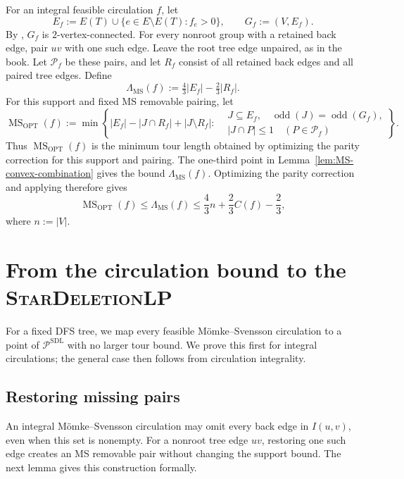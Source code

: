 \documentclass[11pt]{amsart}
\DeclareMathOperator{\odd}{odd}
\newcommand{\1}{\mathbbm{1}}
\newcommand{\MSopt}{\operatorname{MS}_{\mathrm{OPT}}}
\newcommand{\LPone}{\textsc{StarDeletionLP}}
\newcommand{\Pone}{\mathcal P^{\mathrm{SDL}}}
\begin{document}
For an integral feasible circulation $f$, let
\[
 E_f:=E(T)\cup
       \{e\in E\setminus E(T):f_e>0\},
 \qquad G_f:=(V,E_f).
\]
By \cite[Lemma~12.8]{TraubVygen}, $G_f$ is $2$-vertex-connected.
For every nonroot group with a retained back edge, pair $uv$ with
one such edge. Leave the root tree edge unpaired, as in the book.
Let $\mathcal P_f$ be these pairs, and let $R_f$ consist of all
retained back edges and all paired tree edges. Define
\begin{equation}
\label{eq:MS-support-bound}
 \Lambda_{\mathrm{MS}}(f):=\tfrac43|E_f|-\tfrac23|R_f|.
\end{equation}
For this support and fixed \textsc{MS} removable pairing, let
\begin{equation}\label{eq:MS-optimized-parity}
 \MSopt(f)
 :=\min\left\{
 |E_f|-|J\cap R_f|+|J\setminus R_f|:
 \begin{aligned}
 &J\subseteq E_f,\quad\odd(J)=\odd(G_f),\\
 &|J\cap P|\le1\quad(P\in\mathcal P_f)
 \end{aligned}\right\}.
\end{equation}
Thus $\MSopt(f)$ is the minimum tour length obtained
by optimizing the parity correction for this support and pairing.
The one-third point in Lemma~\ref{lem:MS-convex-combination}
gives the bound $\Lambda_{\mathrm{MS}}(f)$. Optimizing the parity
correction and applying \cite[Lemma~12.8]{TraubVygen} therefore gives
\begin{equation}\label{eq:MS-support-vs-cost}
 \MSopt(f)
 \le\Lambda_{\mathrm{MS}}(f)
 \le\frac43n+\frac23C(f)-\frac23,
\end{equation}
where $n:=|V|$.


\section{From the circulation bound to the \LPone{}}
\label{sec:flow-to-framework-1}


For a fixed DFS tree, we map every feasible M\"omke--Svensson
circulation to a point of $\Pone$ with no larger tour
bound. We prove this first for integral circulations; the general
case then follows from circulation integrality.

\subsection{Restoring missing pairs}
\label{subsec:MS-support-restoration}

An integral M\"omke--Svensson circulation may omit every back
edge in $I(u,v)$, even when this set is nonempty.
For a nonroot tree edge $uv$, restoring one such edge creates
an \textsc{MS} removable pair without changing the support bound.
The next lemma gives this construction formally.
\end{document}
